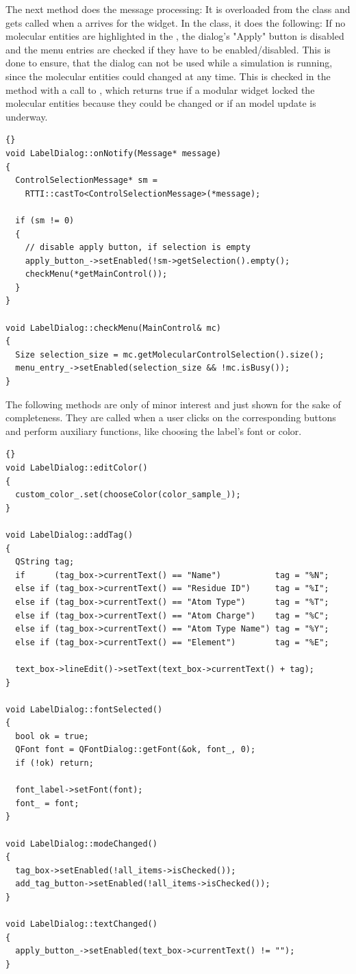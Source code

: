 The next method  does the message processing: \label{onNotify}
It is overloaded from the  class and gets called when a 
 arrives for the widget. In the  class, it 
does the following: If no molecular entities are highlighted in the 
, the dialog's "Apply" button is disabled and the menu 
entries are checked if they have to be enabled/disabled. This is done to 
ensure, that the dialog can not be used while \eg a simulation is running, 
since the molecular entities could changed at any time. This is checked in the 
 method with a call to , 
which returns true if a modular widget locked the molecular entities because 
they could be changed or if an model update is underway.

\begin{lstlisting}{}
void LabelDialog::onNotify(Message* message)
{
  ControlSelectionMessage* sm = 
    RTTI::castTo<ControlSelectionMessage>(*message);

  if (sm != 0)
  {
    // disable apply button, if selection is empty
    apply_button_->setEnabled(!sm->getSelection().empty();
    checkMenu(*getMainControl());
  }
}

void LabelDialog::checkMenu(MainControl& mc)
{
  Size selection_size = mc.getMolecularControlSelection().size();
  menu_entry_->setEnabled(selection_size && !mc.isBusy());
}
\end{lstlisting}

The following methods are only of minor interest and just shown for the sake of
completeness. They are called when a user clicks on the corresponding buttons 
and perform auxiliary functions, like choosing the label's font or color.

\begin{lstlisting}{}
void LabelDialog::editColor()
{
  custom_color_.set(chooseColor(color_sample_));
}

void LabelDialog::addTag()
{
  QString tag;
  if      (tag_box->currentText() == "Name")           tag = "%N";
  else if (tag_box->currentText() == "Residue ID")     tag = "%I";
  else if (tag_box->currentText() == "Atom Type")      tag = "%T";
  else if (tag_box->currentText() == "Atom Charge")    tag = "%C";
  else if (tag_box->currentText() == "Atom Type Name") tag = "%Y";
  else if (tag_box->currentText() == "Element")        tag = "%E";

  text_box->lineEdit()->setText(text_box->currentText() + tag);
}

void LabelDialog::fontSelected()
{
  bool ok = true;
  QFont font = QFontDialog::getFont(&ok, font_, 0);
  if (!ok) return;

  font_label->setFont(font);
  font_ = font;
}

void LabelDialog::modeChanged()
{
  tag_box->setEnabled(!all_items->isChecked());
  add_tag_button->setEnabled(!all_items->isChecked());
}

void LabelDialog::textChanged()
{
  apply_button_->setEnabled(text_box->currentText() != "");
}
\end{lstlisting}

